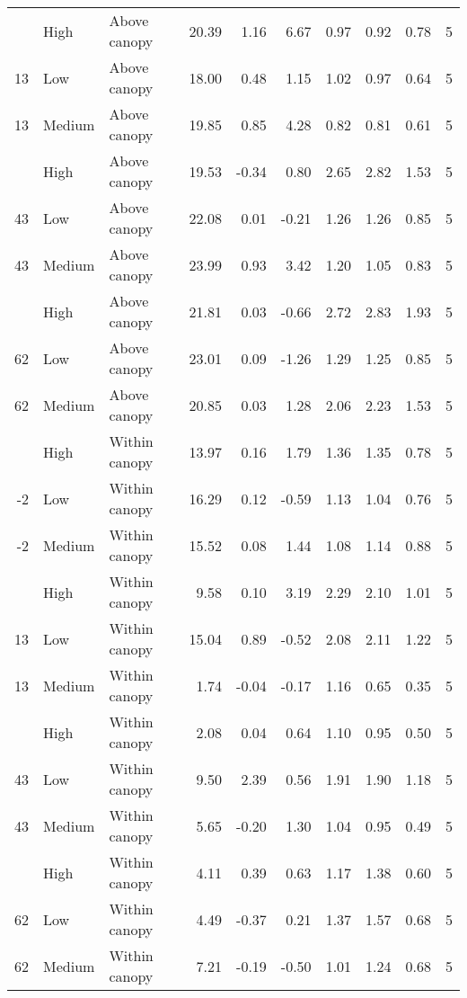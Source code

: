 \documentclass[10pt,]{article}
\begin{document}
\begin{longtable}{rllrrrrrrr}
\addlinespace
13 & High & Above canopy & 20.39 & 1.16 & 6.67 & 0.97 & 0.92 & 0.78 & 5\\
13 & Low & Above canopy & 18.00 & 0.48 & 1.15 & 1.02 & 0.97 & 0.64 & 5\\
13 & Medium & Above canopy & 19.85 & 0.85 & 4.28 & 0.82 & 0.81 & 0.61 & 5\\
\addlinespace
43 & High & Above canopy & 19.53 & -0.34 & 0.80 & 2.65 & 2.82 & 1.53 & 5\\
43 & Low & Above canopy & 22.08 & 0.01 & -0.21 & 1.26 & 1.26 & 0.85 & 5\\
43 & Medium & Above canopy & 23.99 & 0.93 & 3.42 & 1.20 & 1.05 & 0.83 & 5\\
\addlinespace
62 & High & Above canopy & 21.81 & 0.03 & -0.66 & 2.72 & 2.83 & 1.93 & 5\\
62 & Low & Above canopy & 23.01 & 0.09 & -1.26 & 1.29 & 1.25 & 0.85 & 5\\
62 & Medium & Above canopy & 20.85 & 0.03 & 1.28 & 2.06 & 2.23 & 1.53 & 5\\
\addlinespace
-2 & High & Within canopy & 13.97 & 0.16 & 1.79 & 1.36 & 1.35 & 0.78 & 5\\
-2 & Low & Within canopy & 16.29 & 0.12 & -0.59 & 1.13 & 1.04 & 0.76 & 5\\
-2 & Medium & Within canopy & 15.52 & 0.08 & 1.44 & 1.08 & 1.14 & 0.88 & 5\\
\addlinespace
13 & High & Within canopy & 9.58 & 0.10 & 3.19 & 2.29 & 2.10 & 1.01 & 5\\
13 & Low & Within canopy & 15.04 & 0.89 & -0.52 & 2.08 & 2.11 & 1.22 & 5\\
13 & Medium & Within canopy & 1.74 & -0.04 & -0.17 & 1.16 & 0.65 & 0.35 & 5\\
\addlinespace
43 & High & Within canopy & 2.08 & 0.04 & 0.64 & 1.10 & 0.95 & 0.50 & 5\\
43 & Low & Within canopy & 9.50 & 2.39 & 0.56 & 1.91 & 1.90 & 1.18 & 5\\
43 & Medium & Within canopy & 5.65 & -0.20 & 1.30 & 1.04 & 0.95 & 0.49 & 5\\
\addlinespace
62 & High & Within canopy & 4.11 & 0.39 & 0.63 & 1.17 & 1.38 & 0.60 & 5\\
62 & Low & Within canopy & 4.49 & -0.37 & 0.21 & 1.37 & 1.57 & 0.68 & 5\\
62 & Medium & Within canopy & 7.21 & -0.19 & -0.50 & 1.01 & 1.24 & 0.68 & 5\\*
\end{longtable}\endgroup{}
\end{document}

